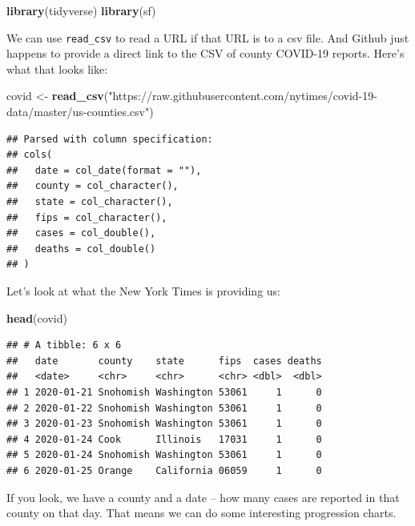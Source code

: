 \documentclass[]{book}
\newenvironment{Shaded}{\begin{snugshade}}{\end{snugshade}}
\newcommand{\KeywordTok}[1]{\textcolor[rgb]{0.13,0.29,0.53}{\textbf{#1}}}
\newcommand{\NormalTok}[1]{#1}
\newcommand{\StringTok}[1]{\textcolor[rgb]{0.31,0.60,0.02}{#1}}
\begin{document}
\begin{Shaded}
\begin{Highlighting}[]
\KeywordTok{library}\NormalTok{(tidyverse)}
\KeywordTok{library}\NormalTok{(sf)}
\end{Highlighting}
\end{Shaded}

We can use \texttt{read\_csv} to read a URL if that URL is to a csv file. And Github just happens to provide a direct link to the CSV of county COVID-19 reports. Here's what that looks like:

\begin{Shaded}
\begin{Highlighting}[]
\NormalTok{covid <-}\StringTok{ }\KeywordTok{read_csv}\NormalTok{(}\StringTok{"https://raw.githubusercontent.com/nytimes/covid-19-data/master/us-counties.csv"}\NormalTok{)}
\end{Highlighting}
\end{Shaded}

\begin{verbatim}
## Parsed with column specification:
## cols(
##   date = col_date(format = ""),
##   county = col_character(),
##   state = col_character(),
##   fips = col_character(),
##   cases = col_double(),
##   deaths = col_double()
## )
\end{verbatim}

Let's look at what the New York Times is providing us:

\begin{Shaded}
\begin{Highlighting}[]
\KeywordTok{head}\NormalTok{(covid)}
\end{Highlighting}
\end{Shaded}

\begin{verbatim}
## # A tibble: 6 x 6
##   date       county    state      fips  cases deaths
##   <date>     <chr>     <chr>      <chr> <dbl>  <dbl>
## 1 2020-01-21 Snohomish Washington 53061     1      0
## 2 2020-01-22 Snohomish Washington 53061     1      0
## 3 2020-01-23 Snohomish Washington 53061     1      0
## 4 2020-01-24 Cook      Illinois   17031     1      0
## 5 2020-01-24 Snohomish Washington 53061     1      0
## 6 2020-01-25 Orange    California 06059     1      0
\end{verbatim}

If you look, we have a county and a date -- how many cases are reported in that county on that day. That means we can do some interesting progression charts.
\end{document}
